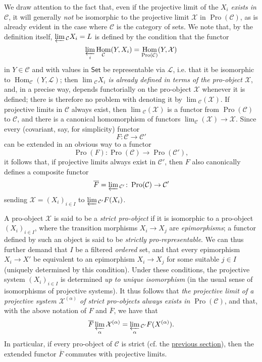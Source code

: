 \documentclass{article}
\renewcommand{\cal}[1]{{\mathcal{#1}}}
\newcommand{\Set}{\mathsf{Set}}
\DeclareMathOperator{\Hom}{Hom}
\DeclareMathOperator{\Pro}{Pro}
\newcommand{\oldpage}[1]{\marginpar{\footnotesize$\Big\vert$ \textit{p.~#1}}}
\begin{document}
We draw attention to the fact that, even if the projective limit of the $X_i$ \emph{exists in $\cal{C}$}, it will generally \emph{not} be isomorphic to the projective limit $\cal{X}$ in $\Pro(\cal{C})$, as is already evident in the case where $\cal{C}$ is the category of sets.
We note that, by the definition itself, $\varprojlim{}_{\cal{C}}X_i=L$ is defined by the condition that the functor
\[
  \varprojlim_i\Hom_{\cal{C}}(Y,X_i)=\Hom_{\Pro(\cal{C})}(Y,\cal{X})
\]
in $Y\in\cal{C}$ and with values in $\Set$ be representable via $\cal{L}$, i.e. that it be isomorphic to $\Hom_{\cal{C}}(Y,\cal{L})$;
then \emph{$\lim{}_{\cal{C}}X_i$ is already defined in terms of the \emph{pro-object} $\cal{X}$}, and, in a precise way, depends functorially on the pro-object $\cal{X}$ whenever it is defined;
there is therefore no problem with denoting it by $\lim{}_{\cal{C}}(\cal{X})$.
If projective limits in $\cal{C}$ always exist, then $\lim{}_{\cal{C}}(\cal{X})$ is a functor from $\Pro(\cal{C})$ to $\cal{C}$, and there is a canonical homomorphism of functors $\lim_\cal{C}(\cal{X})\to\cal{X}$.
Since every (covariant, say, for simplicity) functor
\[
  F\colon \cal{C} \to \cal{C}'
\]
can be extended in an obvious way to a functor
\[
  \Pro(F)\colon \Pro(\cal{C}) \to \Pro(\cal{C}'),
\]
it follows that, if projective limits always exist in $\cal{C}'$, then $F$ also canonically defines a composite functor
\[
  \overline{F} = \varprojlim{}_{\cal{C}'}\colon \Pro(\cal{C}) \to \cal{C}'
\]
sending $\cal{X}=(X_i)_{i\in I}$ to $\varprojlim{}_{\cal{C}'}F(X_i)$.

A pro-object $\cal{X}$ is said to be a \emph{strict pro-object} if it is isomorphic to a pro-object $(X_i)_{i\in I}$, where the transition morphisms $X_i\to X_j$ are \emph{epimorphisms};
a functor defined by such an object is said to be \emph{strictly pro-representable}.
We can thus further demand that $I$ be a filtered \emph{ordered} set, and that every epimorphism
\oldpage{195-05}
$X_i\to X'$ be equivalent to an epimorphism $X_i\to X_j$ for some suitable $j\in I$ (uniquely determined by this condition).
Under these conditions, the projective system $(X_i)_{i\in I}$ is determined \emph{up to unique isomorphism} (in the usual sense of isomorphisms of projective systems).
It thus follows that \emph{the projective limit of a projective system $\cal{X}^{(\alpha)}$ of strict pro-objects always exists in $\Pro(\cal{C})$}, and that, with the above notation of $F$ and $\overline{F}$, we have that
\[
  \overline{F}\varprojlim_\alpha\cal{X}^{(\alpha)} = \varprojlim_\alpha{}_{\cal{C}'}F(X^{(\alpha)}).
\]
In particular, if every pro-object of $\cal{C}$ is strict (cf. the \hyperref[A.1]{previous section}), then the extended functor $\overline{F}$ commutes with projective limits.
\end{document}
